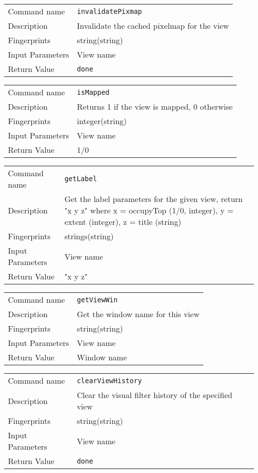 \noindent
\begin{tabular}{l|p{5in}}
\hline
Command name &{\tt invalidatePixmap }\\ 
Description &
 Invalidate the cached pixelmap for the view 
 	\\
Fingerprints & string(string)\\
Input Parameters& View name \\
Return Value&{\tt done}\\
\hline
\end{tabular}
\bigskip

\noindent
\begin{tabular}{l|p{5in}}
\hline
Command name &{\tt isMapped }\\ 
Description &
 Returns 1 if the view is mapped, 0 otherwise 
 	\\
Fingerprints & integer(string)\\
Input Parameters& View name \\
Return Value& 1/0 \\
\hline
\end{tabular}
\bigskip

\noindent
\begin{tabular}{l|p{5in}}
\hline
Command name &{\tt getLabel }\\ 
Description &
 Get the label parameters for the given view, return "x y z" where x = occupyTop (1/0, integer),                y = extent (integer), z = title (string)
 	\\
Fingerprints & strings(string)\\
Input Parameters& View name \\
Return Value& "x y z" \\
\hline
\end{tabular}
\bigskip

\noindent
\begin{tabular}{l|p{5in}}
\hline
Command name &{\tt getViewWin }\\ 
Description &
 Get the window name for this view 
 	\\
Fingerprints & string(string)\\
Input Parameters& View name \\
Return Value& Window name \\
\hline
\end{tabular}
\bigskip

\noindent
\begin{tabular}{l|p{5in}}
\hline
Command name &{\tt clearViewHistory }\\ 
Description &
 Clear the visual filter history of the specified view 
 	\\
Fingerprints & string(string)\\
Input Parameters& View name \\
Return Value&{\tt done}\\
\hline
\end{tabular}
\bigskip

